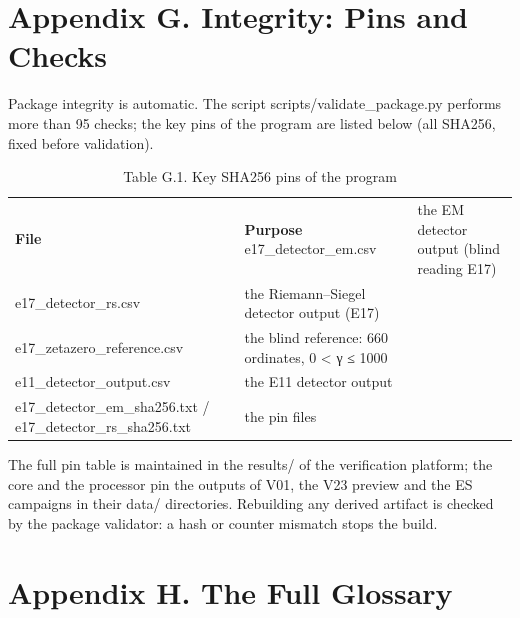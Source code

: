 \documentclass[11pt,a4paper]{article}
\begin{document}
\section{Appendix G. Integrity: Pins and Checks}

Package integrity is automatic. The script scripts/validate\_package.py performs more than 95 checks; the key pins of the program are listed below (all SHA256, fixed before validation).

\begin{table}[htbp]\centering\small
\caption{Table G.1. Key SHA256 pins of the program}
\begin{tabular}{p{} p{}}
\toprule
\textbf{File} & \textbf{Purpose}
\midrule
e17\_detector\_em.csv & the EM detector output (blind reading E17) \\
e17\_detector\_rs.csv & the Riemann–Siegel detector output (E17) \\
e17\_zetazero\_reference.csv & the blind reference: 660 ordinates, 0 < γ ≤ 1000 \\
e11\_detector\_output.csv & the E11 detector output \\
e17\_detector\_em\_sha256.txt / e17\_detector\_rs\_sha256.txt & the pin files \\
\bottomrule
\end{tabular}
\end{table}

The full pin table is maintained in the results/ of the verification platform; the core and the processor pin the outputs of V01, the V23 preview and the ES campaigns in their data/ directories. Rebuilding any derived artifact is checked by the package validator: a hash or counter mismatch stops the build.

\section{Appendix H. The Full Glossary}
\end{document}
